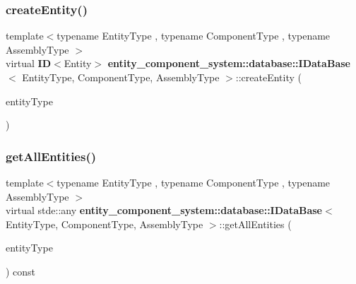 \subsubsection{create\+Entity()}
{\footnotesize\ttfamily template$<$typename Entity\+Type , typename Component\+Type , typename Assembly\+Type $>$ \\
virtual {\bf ID}$<$Entity$>$ {\bf entity\+\_\+component\+\_\+system\+::database\+::\+I\+Data\+Base}$<$ Entity\+Type, Component\+Type, Assembly\+Type $>$\+::create\+Entity (\begin{DoxyParamCaption}\item[{Entity\+Type const}]{entity\+Type }\end{DoxyParamCaption})\hspace{0.3cm}{\ttfamily [pure virtual]}}

\label{classentity__component__system_1_1database_1_1_i_data_base_abad727d40380efadf24294e9ab1e5465} 
\subsubsection{get\+All\+Entities()}
{\footnotesize\ttfamily template$<$typename Entity\+Type , typename Component\+Type , typename Assembly\+Type $>$ \\
virtual stde\+::any {\bf entity\+\_\+component\+\_\+system\+::database\+::\+I\+Data\+Base}$<$ Entity\+Type, Component\+Type, Assembly\+Type $>$\+::get\+All\+Entities (\begin{DoxyParamCaption}\item[{Entity\+Type const}]{entity\+Type }\end{DoxyParamCaption}) const\hspace{0.3cm}{\ttfamily [pure virtual]}}

\label{classentity__component__system_1_1database_1_1_i_data_base_a29002a97151f394a59e3e9e9ce72ea27} 
